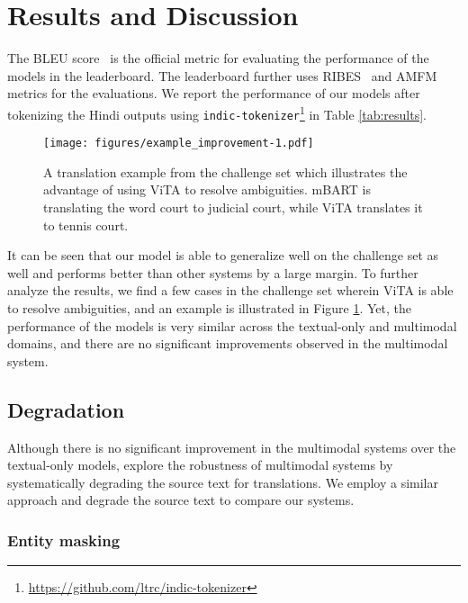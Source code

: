 \documentclass[11pt,a4paper]{article}
\begin{document}
\section{Results and Discussion}

The BLEU score~\citep{papineni-etal-2002-bleu} is the official metric for evaluating the performance of the models in the leaderboard. The leaderboard further uses RIBES~\citep{isozaki-etal-2010-automatic} and AMFM~\citep{banchs-li-2011-fm} metrics for the evaluations.
We report the performance of our models after tokenizing the Hindi outputs using \texttt{indic-tokenizer}\footnote{\url{https://github.com/ltrc/indic-tokenizer}} in Table \ref{tab:results}.

\begin{figure}
    \centering
    \texttt{[image: figures/example\_improvement-1.pdf]}
    \caption{A translation example from the challenge set which illustrates the advantage of using ViTA to resolve ambiguities. mBART is translating the word court to judicial court, while ViTA translates it to tennis court.}
    \label{fig:improvement_eg}
\end{figure}

It can be seen that our model is able to generalize well on the challenge set as well and performs better than other systems by a large margin.
To further analyze the results, we find a few cases in the challenge set wherein ViTA is able to resolve ambiguities, and an example is illustrated in Figure \ref{fig:improvement_eg}.
Yet, the performance of the models is very similar across the textual-only and multimodal domains, and there are no significant improvements observed in the multimodal system. 


\subsection{Degradation}


Although there is no significant improvement in the multimodal systems over the textual-only models, \citet{caglayan-etal-2019-probing} explore the robustness of multimodal systems by systematically degrading the source text for translations. We employ a similar approach and degrade the source text to compare our systems.

\subsubsection{Entity masking}
\end{document}
